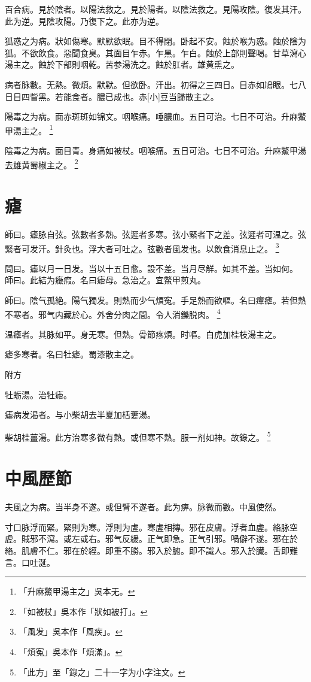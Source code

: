 \documentclass[12pt,twoside,UTF8,b5paper]{ctexbook}
\begin{document}
百合病。見於陰者。以陽法救之。見於陽者。以陰法救之。見陽攻陰。復发其汗。此为逆。見陰攻陽。乃復下之。此亦为逆。

狐惑之为病。狀如傷寒。默默欲眠。目不得閉。卧起不安。蝕於喉为惑。蝕於陰为狐。不欲飲食。惡聞食臭。其面目乍赤。乍黑。乍白。蝕於上部則聲喝。甘草瀉心湯主之。蝕於下部則咽乾。苦参湯洗之。蝕於肛者。雄黄熏之。

病者脉數。无熱。微煩。默默。但欲卧。汗出。初得之三四日。目赤如鳩眼。七八日目四眥黑。若能食者。膿已成也。赤[小]豆当歸散主之。

陽毒之为病。面赤斑斑如锦文。咽喉痛。唾膿血。五日可治。七日不可治。升麻鱉甲湯主之。
	\footnote{「升麻鱉甲湯主之」吳本无。}

陰毒之为病。面目青。身痛如被杖。咽喉痛。五日可治。七日不可治。升麻鱉甲湯去雄黄蜀椒主之。
	\footnote{「如被杖」吳本作「狀如被打」。}

\chapter{瘧}

師曰。瘧脉自弦。弦數者多熱。弦遲者多寒。弦小緊者下之差。弦遲者可温之。弦緊者可发汗。針灸也。浮大者可吐之。弦數者風发也。以飲食消息止之。
	\footnote{「風发」吳本作「風疾」。}

問曰。瘧以月一日发。当以十五日愈。設不差。当月尽觧。如其不差。当如何。\\
師曰。此結为癥瘕。名曰瘧母。急治之。宜鱉甲煎丸。

師曰。陰气孤絶。陽气獨发。則熱而少气煩寃。手足熱而欲嘔。名曰癉瘧。若但熱不寒者。邪气内藏於心。外舍分肉之間。令人消鑠脱肉。
	\footnote{「煩寃」吳本作「煩滿」。}

温瘧者。其脉如平。身无寒。但熱。骨節疼煩。时嘔。白虎加桂枝湯主之。

瘧多寒者。名曰牡瘧。蜀漆散主之。

附方

牡蛎湯。治牡瘧。

瘧病发渴者。与小柴胡去半夏加栝蔞湯。

柴胡桂薑湯。此方治寒多微有熱。或但寒不熱。服一剂如神。故錄之。
	\footnote{「此方」至「錄之」二十一字为小字注文。}

\chapter{中風歷節}

夫風之为病。当半身不遂。或但臂不遂者。此为痹。脉微而數。中風使然。

寸口脉浮而緊。緊則为寒。浮則为虗。寒虗相摶。邪在皮膚。浮者血虗。絡脉空虗。賊邪不瀉。或左或右。邪气反緩。正气即急。正气引邪。喎僻不遂。邪在於絡。肌膚不仁。邪在於經。即重不勝。邪入於腑。即不識人。邪入於臓。舌即難言。口吐涎。
\end{document}
